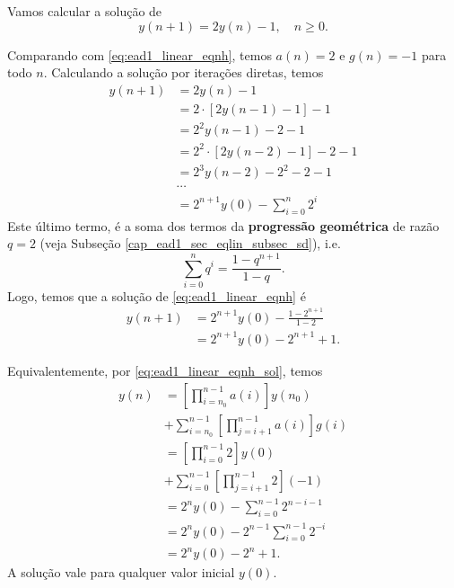 \begin{ex}
  Vamos calcular a solução de
  \begin{equation}\label{eq:ex_ead1_lin_enh}
    y(n+1) = 2y(n) - 1,\quad n\geq 0.
  \end{equation}

  Comparando com \eqref{eq:ead1_linear_eqnh}, temos $a(n) = 2$ e $g(n)=-1$ para todo $n$. Calculando a solução por iterações diretas, temos
  \begin{align}
    y(n+1) &= 2y(n)-1 \\
            &= 2\cdot \left[2y(n-1)-1\right]-1 \\
            &= 2^2y(n-1)-2-1 \\
            &= 2^2\cdot \left[2y(n-2)-1\right]-2-1 \\
            &= 2^3y(n-2)-2^2-2-1 \\
            &\cdots \\
            &= 2^{n+1}y(0)-\sum_{i=0}^{n}2^i
  \end{align}
  Este último termo, é a soma dos termos da {\bf progressão geométrica} de razão $q=2$ (veja Subseção \ref{cap_ead1_sec_eqlin_subsec_sd}), i.e.
  \begin{equation}
    \sum_{i=0}^n q^i = \frac{1-q^{n+1}}{1-q}.
  \end{equation}
  Logo, temos que a solução de \eqref{eq:ead1_linear_eqnh} é
  \begin{align}
    y(n+1) &= 2^{n+1}y(0) - \frac{1-2^{n+1}}{1-2} \\
           &= 2^{n+1}y(0) -2^{n+1}+1.
  \end{align}
  
  Equivalentemente, por \eqref{eq:ead1_linear_eqnh_sol}, temos
  \begin{align}
    y(n) &= \left[\prod_{i=n_0}^{n-1} a(i)\right]y(n_0) \\
         &+ \sum_{i=n_0}^{n-1}\left[\prod_{j=i+1}^{n-1} a(i)\right]g(i) \\
         &= \left[\prod_{i=0}^{n-1} 2\right]y(0) \\
         &+ \sum_{i=0}^{n-1}\left[\prod_{j=i+1}^{n-1} 2\right](-1) \\
         &= 2^ny(0) - \sum_{i=0}^{n-1}2^{n-i-1}\\
         &= 2^ny(0) - 2^{n-1}\sum_{i=0}^{n-1}2^{-i}\\
         &= 2^ny(0) - 2^{n} + 1. \label{eq:ex_ead1_linear_eqnh_sol}
  \end{align}
  A solução vale para qualquer valor inicial $y(0)$.


\end{ex}
